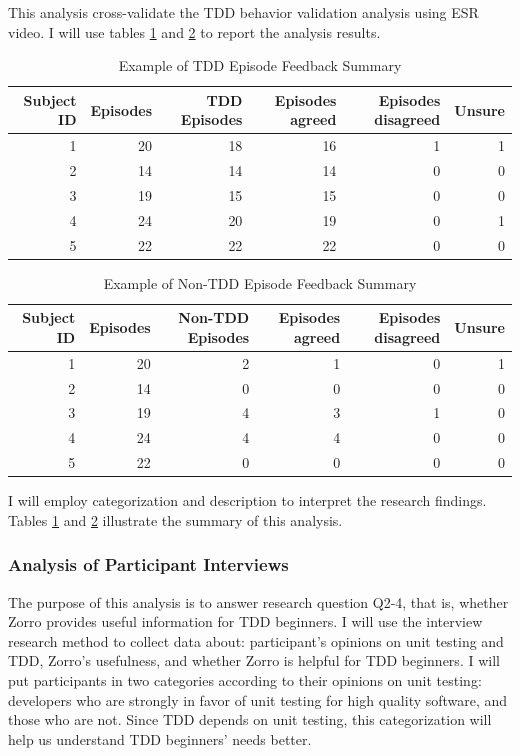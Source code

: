 This analysis cross-validate the TDD behavior validation analysis using
ESR video. I will use tables \ref{tab:TDDEpisodeFeedbackSum} and
\ref{tab:NonTDDEpisodeFeedbackSum} to report the analysis results.
\begin{table}[htbp]
\centering
  \caption{Example of TDD Episode Feedback Summary}\label{tab:TDDEpisodeFeedbackSum}  
  \begin{tabular}{|r|r||r|r|r|r|}
  \hline
    Subject ID & Episodes & TDD Episodes & Episodes agreed & Episodes disagreed & Unsure \\ \hline
    1 & 20 & 18 & 16 & 1 & 1 \\ \hline
    2 & 14 & 14 & 14 & 0 & 0 \\ \hline
    3 & 19 & 15 & 15 & 0 & 0 \\ \hline
    4 & 24 & 20 & 19 & 0 & 1 \\ \hline
    5 & 22 & 22 & 22 & 0 & 0 \\
  \hline
  \end{tabular}
\end{table}
\begin{table}[htbp]
\centering
  \caption{Example of Non-TDD Episode Feedback Summary}\label{tab:NonTDDEpisodeFeedbackSum}  
  \begin{tabular}{|r|r||r|r|r|r|}
  \hline
    Subject ID & Episodes & Non-TDD Episodes & Episodes agreed & Episodes disagreed & Unsure \\ \hline
    1 & 20 & 2 & 1 & 0 & 1 \\ \hline
    2 & 14 & 0 & 0 & 0 & 0 \\ \hline
    3 & 19 & 4 & 3 & 1 & 0 \\ \hline
    4 & 24 & 4 & 4 & 0 & 0 \\ \hline
    5 & 22 & 0 & 0 & 0 & 0 \\
  \hline
  \end{tabular}
\end{table}
I will employ categorization and description to interpret the research
findings. Tables \ref{tab:TDDEpisodeFeedbackSum} and
\ref{tab:NonTDDEpisodeFeedbackSum} illustrate the summary of this analysis.

\subsubsection{Analysis of Participant Interviews}
The purpose of this analysis is to answer research question Q2-4, that
is, whether Zorro provides useful information for TDD beginners. I
will use the interview research method to collect data about:
participant's opinions on unit testing and TDD, Zorro's usefulness,
and whether Zorro is helpful for TDD beginners. I will put
participants in two categories according to their opinions on unit
testing: developers who are strongly in favor of unit testing for high
quality software, and those who are not. Since TDD depends on unit
testing, this categorization will help us understand TDD beginners'
needs better.


